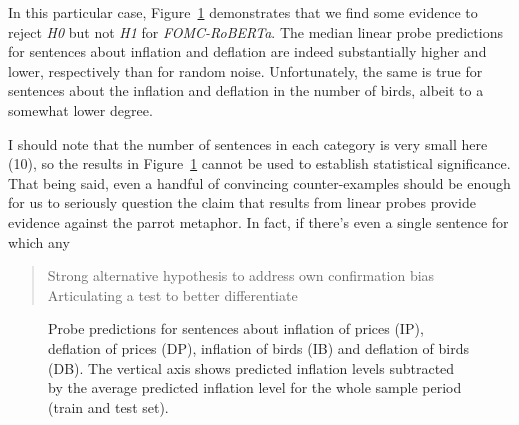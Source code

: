 \documentclass[
  letterpaper,
  DIV=11,
  numbers=noendperiod]{scrartcl}
\theoremstyle{plain}
\theoremstyle{remark}
\begin{document}
In this particular case, Figure~\ref{fig-attack} demonstrates that we
find some evidence to reject \emph{H0} but not \emph{H1} for
\emph{FOMC-RoBERTa}. The median linear probe predictions for sentences
about inflation and deflation are indeed substantially higher and lower,
respectively than for random noise. Unfortunately, the same is true for
sentences about the inflation and deflation in the number of birds,
albeit to a somewhat lower degree.

I should note that the number of sentences in each category is very
small here (10), so the results in Figure~\ref{fig-attack} cannot be
used to establish statistical significance. That being said, even a
handful of convincing counter-examples should be enough for us to
seriously question the claim that results from linear probes provide
evidence against the parrot metaphor. In fact, if there's even a single
sentence for which any

\begin{quote}
Strong alternative hypothesis to address own confirmation bias
Articulating a test to better differentiate
\end{quote}

\begin{figure}


\caption{\label{fig-attack}Probe predictions for sentences about
inflation of prices (IP), deflation of prices (DP), inflation of birds
(IB) and deflation of birds (DB). The vertical axis shows predicted
inflation levels subtracted by the average predicted inflation level for
the whole sample period (train and test set).}

\end{figure}%
\end{document}

